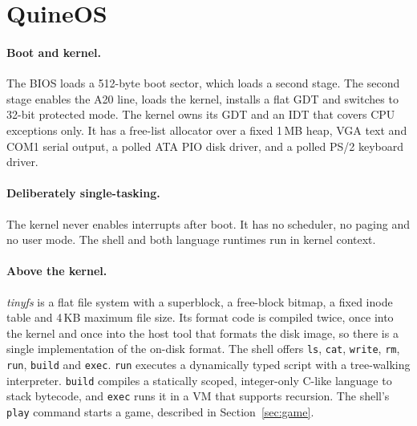 \documentclass{article}
\newcommand{\sysname}{QuineOS}
\begin{document}
\section{\sysname}\label{sec:system}

\paragraph{Boot and kernel.} The BIOS loads a 512-byte boot sector, which loads a second
stage. The second stage enables the A20 line, loads the kernel, installs a flat GDT and
switches to 32-bit protected mode. The kernel owns its GDT and an IDT that covers CPU
exceptions only. It has a free-list allocator over a fixed 1\,MB heap, VGA text and
COM1 serial output, a polled ATA PIO disk driver, and a polled PS/2 keyboard driver.

\paragraph{Deliberately single-tasking.} The kernel never enables interrupts after boot.
It has no scheduler, no paging and no user mode. The shell and both language runtimes run
in kernel context.

\paragraph{Above the kernel.} \emph{tinyfs} is a flat file system with a superblock, a
free-block bitmap, a fixed inode table and 4\,KB maximum file size. Its format code is
compiled twice, once into the kernel and once into the host tool that formats the disk
image, so there is a single implementation of the on-disk format. The shell offers
\texttt{ls}, \texttt{cat}, \texttt{write}, \texttt{rm}, \texttt{run}, \texttt{build} and
\texttt{exec}. \texttt{run} executes a dynamically typed script with a tree-walking
interpreter. \texttt{build} compiles a statically scoped, integer-only C-like language to
stack bytecode, and \texttt{exec} runs it in a VM that supports recursion. The shell's
\texttt{play} command starts a game, described in Section~\ref{sec:game}.
\end{document}

